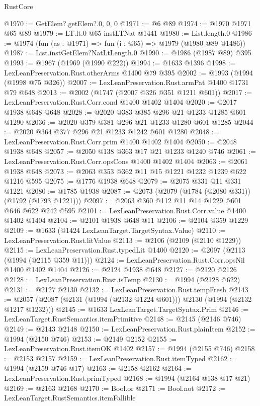 \begin{lexlean}{RustCore}
\begin{coremodule}
@1970 := GetElem?.getElem?.{0, 0, 0}
@1971 := @6 @89
@1974 := @1970 @1971 @65 @89
@1979 := LT.lt.{0} @65 instLTNat @1441
@1980 := List.length.{0}
@1986 := @1974 (fun (as : @1971) => fun (i : @65) => @1979 (@1980 @89 @1486))
@1987 := List.instGetElem?NatLtLength.{0}
@1990 := @1986 (@1987 @89) @395
@1993 := @1967 (@1969 (@1990 @222))
@1994 := @1633 @1396
@1998 := LexLeanPreservation.Rust.otherArms @1400 @79 @395
@2002 := @1993 (@1994 (@1998 @75 @326))
@2007 := LexLeanPreservation.Rust.armPat @1400 @1731 @79 @648
@2013 := @2002 (@1747 (@2007 @326 @351 @1211 @601))
@2017 := LexLeanPreservation.Rust.Corr.cond @1400 @1402 @1404
@2020 := @2017 @1938 @648 @648
@2028 := @2020 @383 @385 @296 @21 @1233 @1285 @601 @1290
@2036 := @2020 @379 @381 @296 @21 @1233 @1280 @601 @1285
@2044 := @2020 @364 @377 @296 @21 @1233 @1242 @601 @1280
@2048 := LexLeanPreservation.Rust.Corr.prim @1400 @1402 @1404
@2050 := @2048 @1938 @648
@2057 := @2050 @138 @363 @17 @21 @1233 @1240 @746
@2061 := LexLeanPreservation.Rust.Corr.opsCons @1400 @1402 @1404
@2063 := @2061 @1938 @648
@2073 := @2063 @353 @362 @11 @15 @1221 @1232 @1239 @622 @1216 @595
@2075 := @1776 @1938 @648
@2079 := @2075 @331 @11 @331 @1221
@2080 := @1785 @1938
@2087 := @2073 (@2079 (@1784 (@2080 @331)) (@1792 (@1793 @1221)))
@2097 := @2063 @360 @112 @11 @14 @1229 @601 @646 @622 @242 @595
@2101 := LexLeanPreservation.Rust.Corr.value @1400 @1402 @1404
@2104 := @2101 @1938 @648 @11
@2106 := @2104 @359 @1229
@2109 := @1633 (@1424 LexLeanTarget.TargetSyntax.Value)
@2110 := LexLeanPreservation.Rust.litValue
@2113 := @2106 (@2109 (@2110 @1229))
@2115 := LexLeanPreservation.Rust.typedLit @1400
@2120 := @2097 (@2113 (@1994 (@2115 @359 @11)))
@2124 := LexLeanPreservation.Rust.Corr.opsNil @1400 @1402 @1404
@2126 := @2124 @1938 @648
@2127 := @2120 @2126
@2128 := LexLeanPreservation.Rust.isTemp
@2130 := @1994 (@2128 @622)
@2131 := @2127 @2130
@2132 := LexLeanPreservation.Rust.tempFresh
@2143 := @2057 (@2087 (@2131 (@1994 (@2132 @1224 @601))) @2130 (@1994 (@2132 @1217 @1232)))
@2145 := @1633 LexLeanTarget.TargetSyntax.Prim
@2146 := LexLeanTarget.RustSemantics.itemPrimitive
@2148 := @2145 (@2146 @746)
@2149 := @2143 @2148
@2150 := LexLeanPreservation.Rust.plainItem
@2152 := @1994 (@2150 @746)
@2153 := @2149 @2152
@2155 := LexLeanPreservation.Rust.itemOK @1402
@2157 := @1994 (@2155 @746)
@2158 := @2153 @2157
@2159 := LexLeanPreservation.Rust.itemTyped
@2162 := @1994 (@2159 @746 @17)
@2163 := @2158 @2162
@2164 := LexLeanPreservation.Rust.primTyped
@2168 := @1994 (@2164 @138 @17 @21)
@2169 := @2163 @2168
@2170 := Bool.or
@2171 := Bool.not
@2172 := LexLeanTarget.RustSemantics.itemFallible

\end{coremodule}
\end{lexlean}
